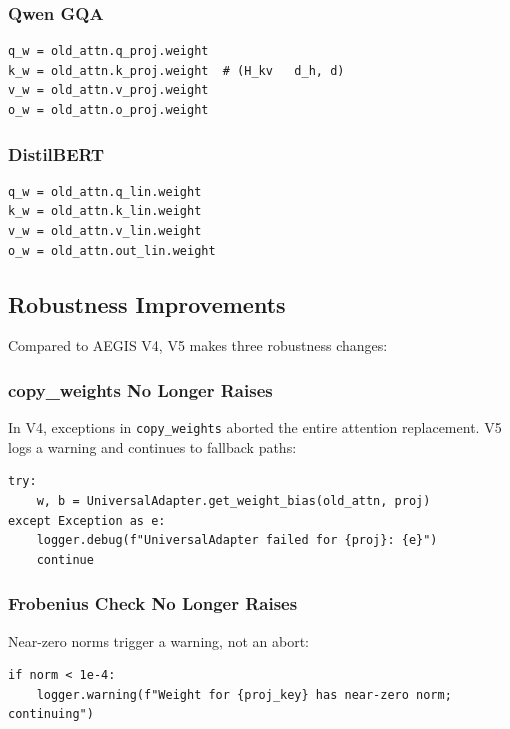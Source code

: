 \subsubsection{Qwen GQA}

\begin{lstlisting}
q_w = old_attn.q_proj.weight
k_w = old_attn.k_proj.weight  # (H_kv   d_h, d)
v_w = old_attn.v_proj.weight
o_w = old_attn.o_proj.weight
\end{lstlisting}

\subsubsection{DistilBERT}

\begin{lstlisting}
q_w = old_attn.q_lin.weight
k_w = old_attn.k_lin.weight
v_w = old_attn.v_lin.weight
o_w = old_attn.out_lin.weight
\end{lstlisting}

\subsection{Robustness Improvements}

Compared to AEGIS V4, V5 makes three robustness changes:

\subsubsection{copy\_weights No Longer Raises}

In V4, exceptions in \texttt{copy\_weights} aborted the entire attention replacement. 
V5 logs a warning and continues to fallback paths:

\begin{lstlisting}
try:
    w, b = UniversalAdapter.get_weight_bias(old_attn, proj)
except Exception as e:
    logger.debug(f"UniversalAdapter failed for {proj}: {e}")
    continue
\end{lstlisting}

\subsubsection{Frobenius Check No Longer Raises}

Near-zero norms trigger a warning, not an abort:

\begin{lstlisting}
if norm < 1e-4:
    logger.warning(f"Weight for {proj_key} has near-zero norm; continuing")
\end{lstlisting}

